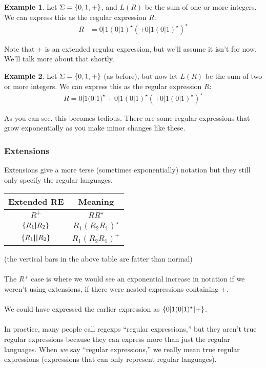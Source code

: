 \documentclass[]{article}
\DeclarePairedDelimiter{\set}{\lbrace}{\rbrace}
\theoremstyle{definition}
\newtheorem{ex}{Example}[section]
\begin{document}
			\begin{ex}
				Let $\Sigma = \set{0, 1, +}$, and $L(R)$ be the sum of one or more integers. We can express this as the regular expression $R$:
				\begin{align*}
					R &= 0 | 1 (0 | 1)^\star{} (+ 0|1(0|1)^\star{})^\star
				\end{align*}

				Note that + is an extended regular expression, but we'll assume it isn't for now. We'll talk more about that shortly.
			\end{ex}

			\begin{ex}
				Let $\Sigma = \set{0, 1, +}$ (as before), but now let $L(R)$ be the sum of two or more integers. We can express this as the regular expression $R$:
				\begin{align*}
					R = 0|1(0|1)^\star{} + 0|1(0|1)^\star{} (+ 0|1(0|1)^\star{})^\star
				\end{align*}

				As you can see, this becomes tedious. There are some regular expressions that grow exponentially as you make minor changes like these.
			\end{ex}

			\subsubsection{Extensions}
				Extensions give a more terse (sometimes exponentially) notation but they still only specify the regular languages.
				
				\begin{center}
					\begin{tabular}{c|c}
						Extended RE & Meaning \\ \hline
						$R^+$ & $RR^\star$ \\
						$\set{R_1 \text{\textbf{|}} R_2}$ & $R_1(R_2R_1)^\star$ \\
						$\set{R_1 \text{\textbf{||}} R_2}$ & $R_1(R_2R_1)^+$
					\end{tabular}
				\end{center}
				(the vertical bars in the above table are fatter than normal)
				\\ \\
				The $R^+$ case is where we would see an exponential increase in notation if we weren't using extensions, if there were nested expressions containing +.
				\\ \\
				We could have expressed the earlier expression as $\set{0|1(0|1)^\star{} \text{\textbf{|}} +}$.
				\\ \\
				In practice, many people call regexps ``regular expressions,'' but they aren't true regular expressions because they can express more than just the regular languages. When \emph{we} say ``regular expressions,'' we really mean true regular expressions (expressions that can only represent regular languages).
			
\end{document}
